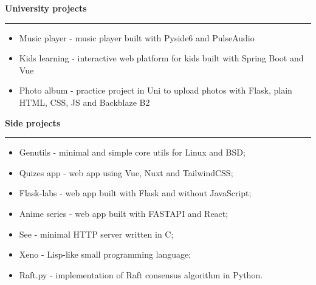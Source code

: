 {
    {\vspace{0.5cm} \hspace{-0.5cm} \Large \textbf{University projects}}
    \par\noindent\rule{\textwidth}{0.1mm}
    \begin{itemize}
        \item {Music player - music player built with Pyside6 and PulseAudio}
        \item {Kids learning - interactive web platform for kids built with Spring Boot and Vue}
        \item {
            Photo album - practice project in Uni to upload photos with Flask, 
            plain HTML, CSS, JS and Backblaze B2
        }
    \end{itemize}

    {\vspace{0.5cm} \hspace{-1cm} \Large \textbf{Side projects}}
    \par\noindent\rule{\textwidth}{0.1mm}
    \begin{itemize}
        \item {Genutils - minimal and simple core utils for Linux and BSD};
        \item {Quizes app - web app using Vue, Nuxt and TailwindCSS};
        \item {Flask-labs - web app built with Flask and without JavaScript};
        \item {Anime series - web app built with FASTAPI and React};
        \item {See - minimal HTTP server written in C};
        \item {Xeno - Lisp-like small programming language};
        \item {Raft.py - implementation of Raft consensus algorithm in Python}.
    \end{itemize}
}
